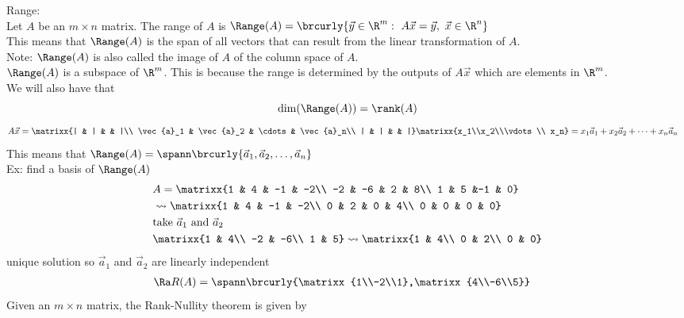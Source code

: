 Range:\\
Let $A$ be an $m\times n$ matrix. The range of $A$ is $\Range(A)=\brcurly{\vec{y}\in\R^m:\ A\vec{x}=\vec{y},\ \vec{x}\in\R^n}$\\
This means that $\Range(A)$ is the span of all vectors that can result from the linear transformation of $A$.\\
Note: $\Range(A)$ is also called the image of $A$ of the column space of $A$.\\
$\Range(A)$ is a subspace of $\R^m$. This is because the range is determined by the outputs of $A\vec{x}$ which are elements in $\R^m$.\\
We will also have that
$$\dim(\Range(A))=\rank(A)$$
\begin{align*}
    &A\vec{x}=\matrixx{| & | & & |\\ \vec{a}_1 & \vec{a}_2 & \cdots & \vec{a}_n\\ | & | & & |}\matrixx{x_1\\x_2\\\vdots\\ x_n}=x_1\vec{a}_1+x_2\vec{a}_2+\cdots+x_n\vec{a}_n
\end{align*}
This means that $\Range(A)=\spann\brcurly{\vec{a}_1,\vec{a}_2,\ldots,\vec{a}_n}$\\
Ex: find a basis of $\Range(A)$
\begin{align*}
    &A=\matrixx{1 & 4 & -1 & -2\\ -2 & -6 & 2 & 8\\ 1 & 5 &-1 & 0}\\
    &\leadsto \matrixx{1 & 4 & -1 & -2\\ 0 & 2 & 0 & 4\\ 0 & 0 & 0 & 0}\\
    &\text{take }\vec{a}_1\text{ and }\vec{a}_2\\
    &\matrixx{1 & 4\\ -2 & -6\\ 1 & 5}\leadsto\matrixx{1 & 4\\ 0 & 2\\ 0 & 0}
\end{align*}
unique solution so $\vec{a}_1$ and $\vec{a}_2$ are linearly independent
\begin{align*}
    &\Ra R(A)=\spann\brcurly{\matrixx{1\\-2\\1},\matrixx{4\\-6\\5}}
\end{align*}
Given an $m\times n$ matrix, the Rank-Nullity theorem is given by
